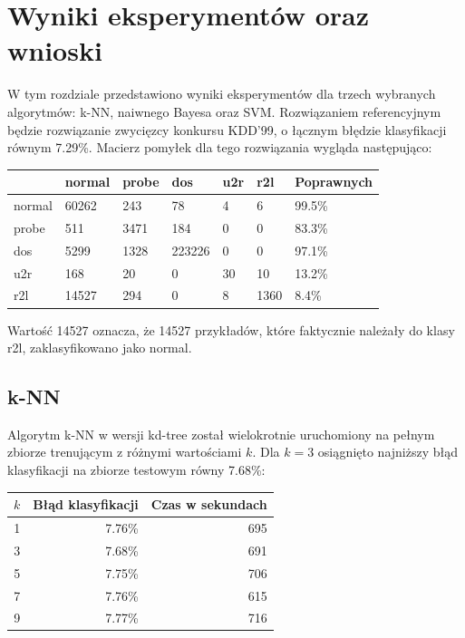 \documentclass[a4paper, 12pt]{article}
\begin{document}
\section{Wyniki eksperymentów oraz wnioski}
\label{sec:wyniki}

W tym rozdziale przedstawiono wyniki eksperymentów dla trzech wybranych algorytmów:
k-NN, naiwnego Bayesa oraz SVM. 
Rozwiązaniem referencyjnym będzie rozwiązanie zwycięzcy konkursu KDD'99,
o łącznym błędzie klasyfikacji równym 7.29\%. Macierz pomyłek dla 
tego rozwiązania wygląda następująco:

\begin{table}[H]
\centering
\begin{tabular}{ | l | l | l | l | l | l | l | } \hline
	& normal & probe & dos 	& u2r 	& r2l 	& Poprawnych	\\ \hline
normal 	& 60262 & 243 	& 78	& 4	& 6 	& 99.5\% 	\\ \hline
probe 	& 511 	& 3471 	& 184	& 0	& 0 	& 83.3\% 	\\ \hline
dos 	& 5299 	& 1328 	& 223226& 0 	& 0 	& 97.1\% 	\\ \hline
u2r 	& 168 	& 20 	& 0	& 30	& 10	& 13.2\%	\\ \hline
r2l 	& 14527 & 294 	& 0	& 8	& 1360	& 8.4\%		\\ \hline
\end{tabular} 
\end{table}

Wartość 14527 oznacza, że 14527 przykładów, które faktycznie należały do klasy r2l, zaklasyfikowano
jako normal.

\subsection{k-NN}

Algorytm k-NN w wersji kd-tree został wielokrotnie uruchomiony na pełnym zbiorze trenującym
z różnymi wartościami $k$.
Dla $k=3$ osiągnięto najniższy błąd klasyfikacji na zbiorze testowym równy 7.68\%:

\begin{table}[H]
\centering
\begin{tabular}{ | r | r | r | } \hline
$k$ & Błąd klasyfikacji & Czas w sekundach \\ \hline
1 & 7.76\% & 695 \\ \hline
3 & 7.68\% & 691 \\ \hline
5 & 7.75\% & 706 \\ \hline
7 & 7.76\% & 615 \\ \hline
9 & 7.77\% & 716 \\ \hline
\end{tabular} 
\end{table}
\end{document}
